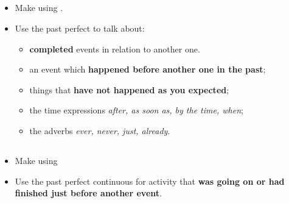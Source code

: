 \subsection{}
\begin{itemize}
    \item[\doot] Make using .
    \item[\doot] Use the past perfect to talk about:
    \begin{itemize}
        \item[\daash] \textbf{completed} events in relation to another one.
        \item[\daash] an event which \textbf{happened before another one in the past};
        \item[\daash] things that \textbf{have not happened as you expected};
        \item[\daash]  the time expressions \textit{after, as soon as, by the time, when};
        \item[\daash]  the adverbs \textit{ever, never, just, already}.
    \end{itemize}
\end{itemize}

\subsection{}
\begin{itemize}
    \item[\doot] Make using 
    \item[\doot] Use the past perfect continuous for activity that \textbf{was going on or had finished just before another event}.
\end{itemize}